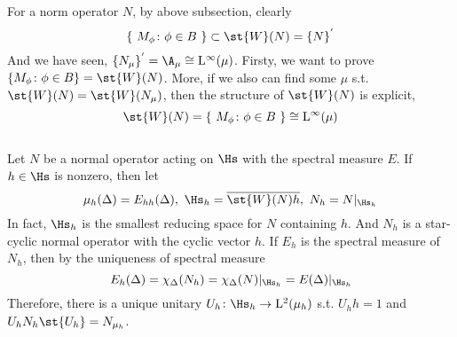 For a norm operator $N$, by above subsection, clearly
\begin{equation*}
	\{~M_{\phi} \colon \phi \in B~\} \subset \st{W}(N) = \{N\}^{'}
\end{equation*}
And we have seen, $\{N_{\mu}\}^{'} = \A_{\mu} \cong \lfs{\infty}(\mu)$. Firsty, we want to prove $\{M_{\phi} \colon \phi \in B\} = \st{W}(N)$. More, if we also can find some $\mu$ s.t. $\st{W}(N)=\st{W}(N_{\mu})$, then the structure of $\st{W}(N)$ is explicit, 
\begin{equation*}
	\st{W}(N) = \{~M_{\phi} \colon \phi \in B~\} \cong \lfs{\infty}(\mu)
\end{equation*}
\\
Let $N$ be a normal operator acting on $\Hs$ with the spectral measure $E$. If $h \in \Hs$ is nonzero, then let 
\begin{equation*}
	\mu_h(\Delta) = E_{hh}(\Delta),~\Hs_h=\clo{\st{W}(N)h},~N_h = N|_{\Hs_h}
\end{equation*}
In fact, $\Hs_h$ is the smallest reducing space for $N$ containing $h$. And $N_h$ is a star-cyclic normal operator with the cyclic vector $h$. If $E_h$ is the spectral measure of $N_h$, then by the uniqueness of spectral measure
\begin{equation*}
	E_h(\Delta) = \chi_{\Delta}(N_h) = \chi_{\Delta}(N)|_{\Hs_h} = E(\Delta)|_{\Hs_h}
\end{equation*}
Therefore, there is a unique unitary $U_h \colon \Hs_h \sto \lfs{2}(\mu_h)$ s.t. $U_hh=1$ and $U_h N_h \st{U_h} = N_{\mu_h}$.


